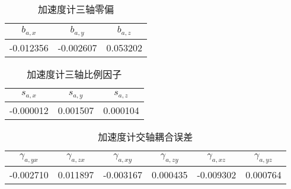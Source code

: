 \documentclass{ctexart}
\begin{document}
\begin{table}[H]
	\centering
	\begin{tabular}{ccc}
	\toprule[1.5pt]
	$b_{a,x}$&$b_{a,y}$&$b_{a,z}$\\
	\midrule
	-0.012356&-0.002607&0.053202\\
	\bottomrule[1.5pt]
	\end{tabular}
	\caption{加速度计三轴零偏}
\end{table}

\begin{table}[H]
	\centering
	\begin{tabular}{ccc}
	\toprule[1.5pt]
	$s_{a,x}$&$s_{a,y}$&$s_{a,z}$\\
	\midrule
	-0.000012&0.001507&0.000104\\
	\bottomrule[1.5pt]
	\end{tabular}
	\caption{加速度计三轴比例因子}
\end{table}

\begin{table}[H]
	\centering
	\begin{tabular}{cccccc}
	\toprule[1pt]
	$\gamma_{a,yx}$&$\gamma_{a,zx}$&$\gamma_{a,xy}$&$\gamma_{a,zy}$&$\gamma_{a,xz}$&$\gamma_{a,yz}$\\
	\midrule
	-0.002710&0.011897&-0.003167&0.000435&-0.009302&0.000764\\
	\bottomrule[1.5pt]
	\end{tabular}
	\caption{加速度计交轴耦合误差}
\end{table}
\end{document}
